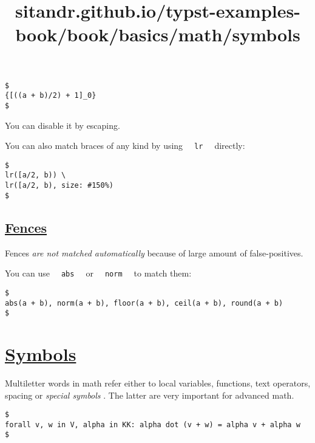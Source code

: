 \begin{verbatim}
$
{[((a + b)/2) + 1]_0}
$
\end{verbatim}

\pandocbounded{}

You can disable it by escaping.

You can also match braces of any kind by using
\texttt{\ }{\texttt{\ lr\ }}\texttt{\ } directly:

\begin{verbatim}
$
lr([a/2, b)) \
lr([a/2, b), size: #150%)
$
\end{verbatim}

\pandocbounded{}

\subsection{\texorpdfstring{\hyperref[fences]{Fences}}{Fences}}\label{fences}

Fences \emph{are not matched automatically} because of large amount of
false-positives.

You can use \texttt{\ }{\texttt{\ abs\ }}\texttt{\ } or
\texttt{\ }{\texttt{\ norm\ }}\texttt{\ } to match them:

\begin{verbatim}
$
abs(a + b), norm(a + b), floor(a + b), ceil(a + b), round(a + b)
$
\end{verbatim}

\pandocbounded{}


\title{sitandr.github.io/typst-examples-book/book/basics/math/symbols}

\section{\texorpdfstring{\hyperref[symbols]{Symbols}}{Symbols}}\label{symbols}

Multiletter words in math refer either to local variables, functions,
text operators, spacing or \emph{special symbols} . The latter are very
important for advanced math.

\begin{verbatim}
$
forall v, w in V, alpha in KK: alpha dot (v + w) = alpha v + alpha w
$
\end{verbatim}

